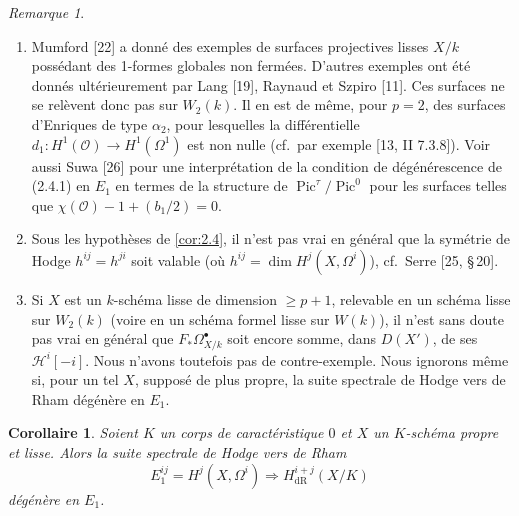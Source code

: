 \documentclass[12pt,a4paper]{article}
\theoremstyle{plain}
\newtheorem{corollary}[theorem]{Corollaire}
\theoremstyle{definition}
\theoremstyle{remark}
\newtheorem{remark}[theorem]{Remarque}
\DeclareMathOperator{\Pic}{Pic}
\newcommand{\cO}{\mathcal{O}}
\newcommand{\dR}{\text{dR}}
\begin{document}
\begin{remark}\label{rem:2.6}
\begin{enumerate}[label=(\roman*)]
\item Mumford [22] a donn\'e des exemples de surfaces projectives lisses $X/k$ poss\'edant des 1-formes globales non ferm\'ees. D'autres exemples ont \'et\'e donn\'es ult\'erieurement par Lang [19], Raynaud et Szpiro [11]. Ces surfaces ne se rel\`event donc pas sur $W_2(k)$. Il en est de m\^eme, pour $p = 2$, des surfaces d'Enriques de type $\alpha_2$, pour lesquelles la diff\'erentielle $d_1: H^1(\cO) \to H^1(\Omega^1)$ est non nulle (cf.~par exemple [13, II 7.3.8]). Voir aussi Suwa [26] pour une interpr\'etation de la condition de d\'eg\'en\'erescence de (2.4.1) en $E_1$ en termes de la structure de $\Pic^\tau/\Pic^0$ pour les surfaces telles que $\chi(\cO) - 1 + (b_1/2) = 0$.

\item Sous les hypoth\`eses de \ref{cor:2.4}, il n'est pas vrai en g\'en\'eral que la sym\'etrie de Hodge $h^{ij} = h^{ji}$ soit valable (o\`u $h^{ij} = \dim H^j(X, \Omega^i)$), cf.~Serre [25, \S\,20].

\item Si $X$ est un $k$-sch\'ema lisse de dimension $\ge p+1$, relevable en un sch\'ema lisse sur $W_2(k)$ (voire en un sch\'ema formel lisse sur $W(k)$), il n'est sans doute pas vrai en g\'en\'eral que $F_* \Omega^{\bullet}_{X/k}$ soit encore somme, dans $D(X')$, de ses $\mathscr{H}^i[-i]$. Nous n'avons toutefois pas de contre-exemple. Nous ignorons m\^eme si, pour un tel $X$, suppos\'e de plus propre, la suite spectrale de Hodge vers de Rham d\'eg\'en\`ere en $E_1$.
\end{enumerate}
\end{remark}

\begin{corollary}\label{cor:2.7}
Soient $K$ un corps de caract\'eristique $0$ et $X$ un $K$-sch\'ema propre et lisse. Alors la suite spectrale de Hodge vers de Rham
\begin{equation}\label{eq:2.7.1}
E_1^{ij} = H^j(X, \Omega^i) \Rightarrow H^{i+j}_{\dR}(X/K)
\end{equation}
d\'eg\'en\`ere en $E_1$.
\end{corollary}
\end{document}

